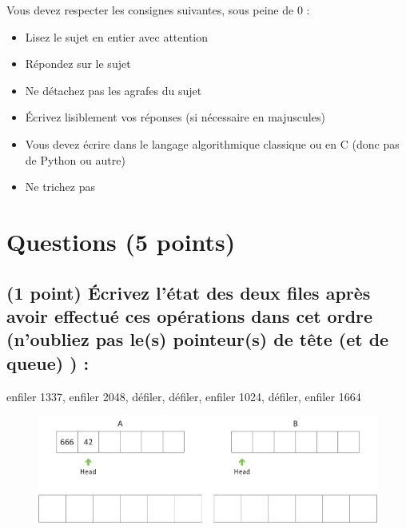 \documentclass[11pt,a4paper]{article}
\begin{document}
\MakeExamTitle                   %


\bigskip

Vous devez respecter les consignes suivantes, sous peine de 0 :

\begin{itemize}
\item Lisez le sujet en entier avec attention
\item Répondez sur le sujet
\item Ne détachez pas les agrafes du sujet
\item \'Ecrivez lisiblement vos réponses (si nécessaire en majuscules)
\item Vous devez écrire dans le langage algorithmique classique ou en C (donc pas de Python ou autre)
\item Ne trichez pas
\end{itemize}



\section{Questions (5 points)}

\subsection{(1 point) \'Ecrivez l'état des deux files après avoir effectué ces opérations dans cet ordre (n'oubliez pas le(s) pointeur(s) de tête (et de queue) ) : }

\bigskip

\vfill
\hspace{0pt}

\begin{center}

\begin{large}
enfiler 1337, enfiler 2048, défiler, défiler, enfiler 1024, défiler, enfiler 1664
\end{large}


\bigskip

\begin{figure}[ht!]
\centering
\centerline{  %
\includegraphics[scale=1]{img/Exercice1.png}
}
\end{figure}

\end{center}
\end{document}
